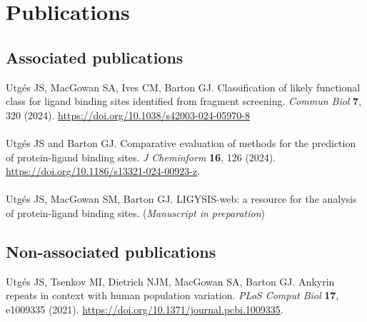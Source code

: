 \chapter*{Publications}

\section*{Associated publications}

Utgés JS, MacGowan SA, Ives CM, Barton GJ. Classification of likely functional class for ligand binding sites identified from fragment screening. \textit{Commun Biol} \textbf{7}, 320 (2024). \url{https://doi.org/10.1038/s42003-024-05970-8}
\\\\ 
\noindent
Utgés JS and Barton GJ. Comparative evaluation of methods for the prediction of protein-ligand binding sites. \textit{J Cheminform} \textbf{16}, 126 (2024). \url{https://doi.org/10.1186/s13321-024-00923-z}.
\\\\ 
\noindent
Utgés JS, MacGowan SM, Barton GJ. LIGYSIS-web: a resource for the analysis of protein-ligand binding sites. (\textit{Manuscript in preparation})

\section*{Non-associated publications}

Utgés JS, Tsenkov MI, Dietrich NJM, MacGowan SA, Barton GJ. Ankyrin repeats in context with human population variation. \textit{PLoS Comput Biol} \textbf{17}, e1009335 (2021). \url{https://doi.org/10.1371/journal.pcbi.1009335}.